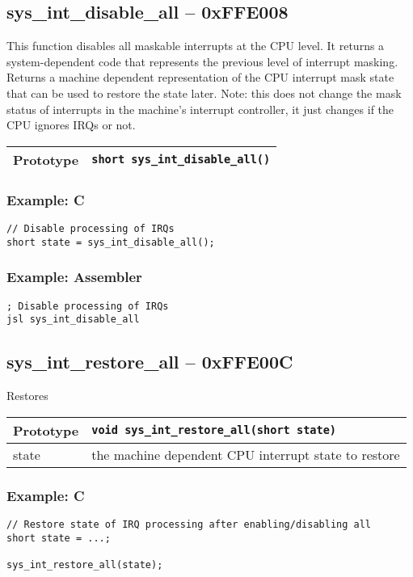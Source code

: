 \subsection*{sys\_int\_disable\_all -- 0xFFE008}
This function disables all maskable interrupts at the CPU level. It returns a system-dependent code that represents the previous level of interrupt masking. 
Returns a machine dependent representation of the CPU interrupt mask state that can be used to restore the state later.
Note: this does not change the mask status of interrupts in the machine's interrupt controller, it just changes if the CPU ignores IRQs or not.

\bigskip

\begin{tabular}{|l||l|} \hline
Prototype & \lstinline!short sys_int_disable_all()! \\ \hline
\end{tabular}

\subsubsection*{Example: C}
\begin{lstlisting}
// Disable processing of IRQs
short state = sys_int_disable_all();
\end{lstlisting}

\subsubsection*{Example: Assembler}
\begin{verbatim}
; Disable processing of IRQs
jsl sys_int_disable_all
\end{verbatim}


\subsection*{sys\_int\_restore\_all -- 0xFFE00C}
Restores 

\bigskip

\begin{tabular}{|l||l|} \hline
Prototype & \lstinline!void sys_int_restore_all(short state)! \\ \hline
state & the machine dependent CPU interrupt state to restore
\end{tabular}

\subsubsection*{Example: C}
\begin{lstlisting}
// Restore state of IRQ processing after enabling/disabling all
short state = ...;

sys_int_restore_all(state);
\end{lstlisting}

